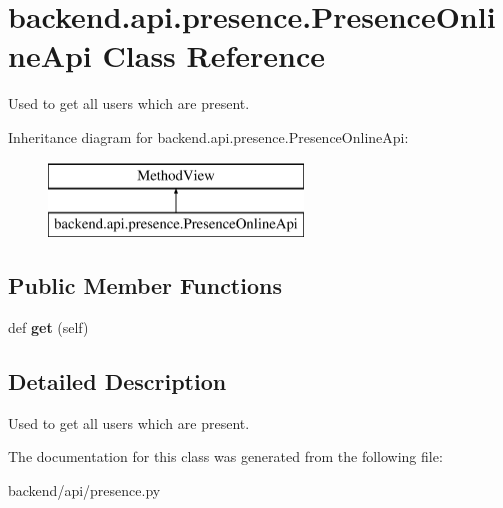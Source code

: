 \hypertarget{classbackend_1_1api_1_1presence_1_1_presence_online_api}{}\section{backend.\+api.\+presence.\+Presence\+Online\+Api Class Reference}
\label{classbackend_1_1api_1_1presence_1_1_presence_online_api}


Used to get all users which are present.  


Inheritance diagram for backend.\+api.\+presence.\+Presence\+Online\+Api\+:\begin{figure}[H]
\begin{center}
\leavevmode
\includegraphics[height=2.000000cm]{classbackend_1_1api_1_1presence_1_1_presence_online_api}
\end{center}
\end{figure}
\subsection*{Public Member Functions}
\begin{DoxyCompactItemize}
\item 
\hypertarget{classbackend_1_1api_1_1presence_1_1_presence_online_api_a9b987826d3a427665a5d644b722a74fd}{}def {\bfseries get} (self)\label{classbackend_1_1api_1_1presence_1_1_presence_online_api_a9b987826d3a427665a5d644b722a74fd}

\end{DoxyCompactItemize}


\subsection{Detailed Description}
Used to get all users which are present. 

The documentation for this class was generated from the following file\+:\begin{DoxyCompactItemize}
\item 
backend/api/presence.\+py\end{DoxyCompactItemize}
